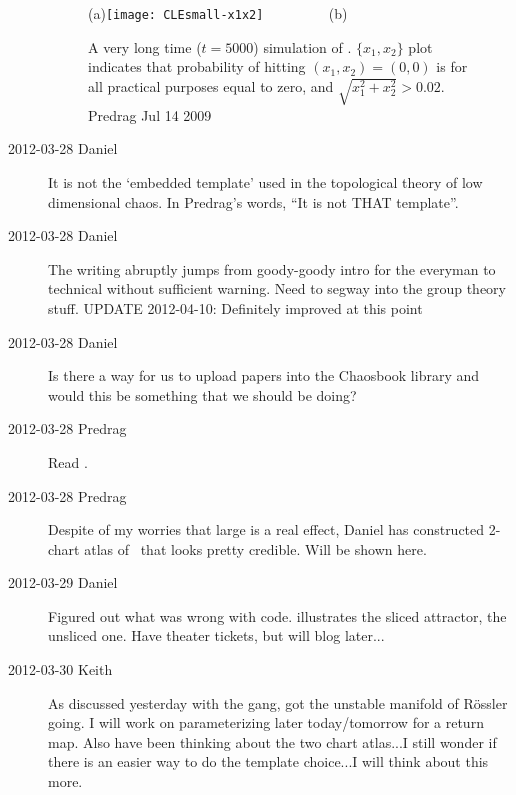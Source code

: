 \begin{description}
 \begin{figure}
 \begin{center}
(a)\texttt{[image: CLEsmall-x1x2]}%
~~~~~~~~
(b) %
 \end{center}
 \caption{\label{fig:CLEsmall-x1x2}
A very long time ($t=5000$) simulation of \cLf. $\{x_1,x_2\}$ plot indicates
that probability of hitting $(x_1,x_2) =(0,0)$ is for all practical purposes
equal to zero, and $\sqrt{x_1^2+x_2^2} > 0.02$.
\hfill Predrag {Jul 14 2009}
}
\end{figure}


\item[2012-03-28 Daniel]                        \toCB
It is not the `embedded template' used in the topological theory of low
dimensional chaos. In Predrag's words, ``It is not THAT template''.

\item[2012-03-28 Daniel]
   The writing abruptly jumps from goody-goody intro for the everyman to
   technical without sufficient warning. Need to segway into the group
   theory stuff. UPDATE 2012-04-10: Definitely improved at this point

\item[2012-03-28 Daniel]
Is there a way for us to upload papers into the Chaosbook library and
would this be something that we should be doing?

\item[2012-03-28 Predrag] Read .

\item[2012-03-28 Predrag] Despite of my worries that
large {\phaseVel} is a real effect, Daniel has constructed 2-chart
atlas of \cLe\ that looks pretty credible. Will be shown here.

\item[2012-03-29 Daniel] Figured out what was wrong with code.
 illustrates the sliced attractor,
 the unsliced one. Have theater tickets, but will
blog later...

\item[2012-03-30 Keith] As discussed yesterday with the gang, got the
unstable manifold of R\"ossler going.  I will work on parameterizing later
today/tomorrow for a return map.  Also have been thinking about the two
chart atlas...I still wonder if there is an easier way to do the template
choice...I will think about this more.


\end{description}
